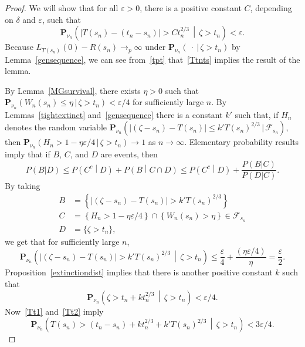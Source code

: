\documentclass[AHL,Unicode,longabstracts,published]{cedram}
\newcommand*\eps{\varepsilon}
\renewcommand*\P{\mathbf{P}}
\newcommand\F{\mathcal{F}}
\newcommand{\1} {\mathds{1}}
\begin{document}
\begin{proof}
We will show that for all $\eps > 0$, there is a positive constant $C$, depending on $\delta$ and $\eps$, such that
\begin{equation}\label{Ttnts}
\P_{\nu_n}\left(\left|T(s_n) - (t_n - s_n)\right| > C t_n^{2/3} \,\middle|\, \zeta > t_n\right) < \eps.
\end{equation}
Because $L_{T(s_n)}(0) - R(s_n) \rightarrow_p \infty$ under $\P_{\nu_n}(\: \cdot \:|\,\zeta > t_n)$ by Lemma~\ref{gensequence}, we can see from~\eqref{tpt} that~\eqref{Ttnts} implies the result of the lemma.

By Lemma~\ref{MGsurvival}, there exists $\eta > 0$ such that $\P_{\nu_n}(W_n(s_n) \leq \eta\,|\,\zeta > t_n) < \eps/4$ for sufficiently large $n$. By Lemmas~\ref{tightextinct} and~\ref{gensequence} there is a constant $k'$ such that, if $H_n$ denotes the random variable $\P_{\nu_n}(|(\zeta - s_n) - T(s_n)| \leq k' T(s_n)^{2/3}\,|\,\F_{s_n})$, then $\P_{\nu_n}(H_n > 1 - \eta \eps/4 \,|\, \zeta > t_n) \rightarrow 1$ as $n \rightarrow \infty$. Elementary probability results imply that if $B$, $C$, and $D$ are events, then
\[
P(B|D) \leq P\left(C^c\middle|D\right) + P\left(B\middle|C \cap D\right) \leq P\left(C^c\middle|D\right) + \frac{P(B|C)}{P(D|C)}.
\]
By taking
\begin{align*}
B &= \left\{\left|(\zeta - s_n) - T(s_n)\right| > k'T(s_n)^{2/3}\right\} \\
C &= \left\{H_n > 1 - \eta \eps/4\right\} \cap \left\{W_n(s_n) > \eta\right\} \in \F_{s_n} \\
D &= \{\zeta > t_n\},
\end{align*}
we get that for sufficiently large $n$,
\begin{equation}\label{Tt1}
\P_{\nu_n}\left(\left|(\zeta - s_n) - T(s_n)\right| > k'T(s_n)^{2/3} \,\middle|\, \zeta > t_n\right) \leq \frac{\eps}{4} + \frac{(\eta \eps/4)}{\eta} = \frac{\eps}{2}.
\end{equation}
Proposition~\ref{extinctiondist} implies that there is another positive constant $k$ such that
\begin{equation}\label{Tt2}
\P_{\nu_n}\left(\zeta > t_n + kt_n^{2/3} \,\middle|\, \zeta > t_n\right) < \eps/4.
\end{equation}
Now~\eqref{Tt1} and~\eqref{Tt2} imply
\begin{equation}\label{Tt3}
\P_{\nu_n}\left(T(s_n) > (t_n - s_n) + kt_n^{2/3} + k'T(s_n)^{2/3} \,\middle|\, \zeta > t_n\right) < 3 \eps/4.
\end{equation}


\end{proof}
\end{document}
